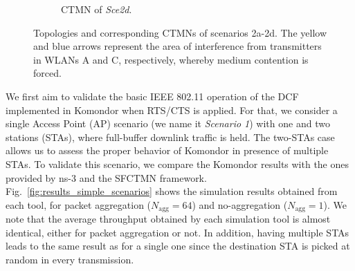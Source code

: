 \documentclass{article}
\begin{document}
\begin{figure}[ht!]
\begin{subfigure}{0.24\textwidth}
			\caption{CTMN of \textit{Sce2d}.} \label{fig:c_d}
		\end{subfigure}
		\caption{Topologies and corresponding CTMNs of scenarios 2a-2d. The yellow and blue arrows represent the area of interference from transmitters in WLANs A and C, respectively, whereby medium contention is forced.}
		\label{fig:complex_scenarios}
	\end{figure}
	
	We first aim to validate the basic IEEE 802.11 operation of the DCF implemented in Komondor when RTS/CTS is applied. For that, we consider a single Access Point (AP) scenario (we name it \textit{Scenario 1}) with one and two stations (STAs), where full-buffer downlink traffic is held. The two-STAs case allows us to assess the proper behavior of Komondor in presence of multiple STAs. To validate this scenario, we compare the Komondor results with the ones provided by ns-3 and the SFCTMN framework. Fig.~\ref{fig:results_simple_scenarios} shows the simulation results obtained from each tool, for packet aggregation ($N_{\text{agg}} = 64$) and no-aggregation ($N_{\text{agg}} = 1$). We note that the average throughput obtained by each simulation tool is almost identical, either for packet aggregation or not. In addition, having multiple STAs leads to the same result as for a single one since the destination STA is picked at random in every transmission.
	
\end{document}
